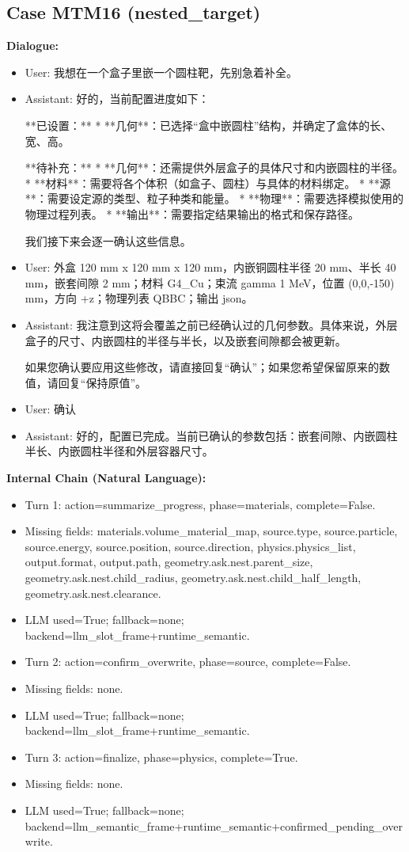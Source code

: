 \documentclass[11pt]{ctexart}
\begin{document}
\subsection{Case MTM16 (nested\_target)}
\textbf{Dialogue:}
\begin{itemize}
\item User: 我想在一个盒子里嵌一个圆柱靶，先别急着补全。
\item Assistant: 好的，当前配置进度如下：

**已设置：**
*   **几何**：已选择“盒中嵌圆柱”结构，并确定了盒体的长、宽、高。

**待补充：**
*   **几何**：还需提供外层盒子的具体尺寸和内嵌圆柱的半径。
*   **材料**：需要将各个体积（如盒子、圆柱）与具体的材料绑定。
*   **源**：需要设定源的类型、粒子种类和能量。
*   **物理**：需要选择模拟使用的物理过程列表。
*   **输出**：需要指定结果输出的格式和保存路径。

我们接下来会逐一确认这些信息。
\item User: 外盒 120 mm x 120 mm x 120 mm，内嵌铜圆柱半径 20 mm、半长 40 mm，嵌套间隙 2 mm；材料 G4\_Cu；束流 gamma 1 MeV，位置 (0,0,-150) mm，方向 +z；物理列表 QBBC；输出 json。
\item Assistant: 我注意到这将会覆盖之前已经确认过的几何参数。具体来说，外层盒子的尺寸、内嵌圆柱的半径与半长，以及嵌套间隙都会被更新。

如果您确认要应用这些修改，请直接回复“确认”；如果您希望保留原来的数值，请回复“保持原值”。
\item User: 确认
\item Assistant: 好的，配置已完成。当前已确认的参数包括：嵌套间隙、内嵌圆柱半长、内嵌圆柱半径和外层容器尺寸。
\end{itemize}
\textbf{Internal Chain (Natural Language):}
\begin{itemize}
\item Turn 1: action=summarize\_progress, phase=materials, complete=False.
\item Missing fields: materials.volume\_material\_map, source.type, source.particle, source.energy, source.position, source.direction, physics.physics\_list, output.format, output.path, geometry.ask.nest.parent\_size, geometry.ask.nest.child\_radius, geometry.ask.nest.child\_half\_length, geometry.ask.nest.clearance.
\item LLM used=True; fallback=none; backend=llm\_slot\_frame+runtime\_semantic.
\item Turn 2: action=confirm\_overwrite, phase=source, complete=False.
\item Missing fields: none.
\item LLM used=True; fallback=none; backend=llm\_slot\_frame+runtime\_semantic.
\item Turn 3: action=finalize, phase=physics, complete=True.
\item Missing fields: none.
\item LLM used=True; fallback=none; backend=llm\_semantic\_frame+runtime\_semantic+confirmed\_pending\_overwrite.
\end{itemize}
\end{document}
